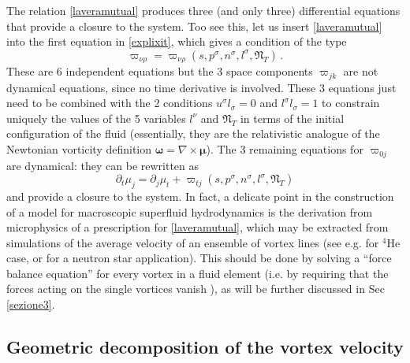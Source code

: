\documentclass[preprints,article,accept,moreauthors,pdftex]{mdpi}
\begin{document}
The relation \eqref{laveramutual} produces three (and only three) differential equations that provide a closure to the system. Too see this, let us insert \eqref{laveramutual} into the first equation in \eqref{explixit}, which gives a condition of the type
\begin{equation}
\varpi_{\nu \rho} = \varpi_{\nu \rho} (s,p^\sigma,n^\sigma,l^\sigma,\mathfrak{N}_{T}) \, .
\end{equation}  
These are 6 independent equations but the 3 space components $\varpi_{jk}$ are not dynamical equations, since no time derivative is involved. These 3 equations just need to be combined with the 2 conditions $u^\sigma l_\sigma=0$ and $l^\sigma l_\sigma=1$ to constrain uniquely the values of the 5 variables $l^\nu$ and $\mathfrak{N}_{T}$ in terms of the initial configuration of the fluid (essentially, they are the relativistic analogue of the Newtonian vorticity definition $\boldsymbol{\omega}=\nabla \times \boldsymbol{\mu}$).  
The 3 remaining equations for $\varpi_{0j}$ are dynamical: they can be rewritten as
\begin{equation}
\partial_t \mu_j = \partial_j \mu_t + \varpi_{tj} (s,p^\sigma,n^\sigma,l^\sigma,\mathfrak{N}_{T})
\end{equation}
and provide a closure to the system.
In fact, a delicate point in the construction of a model for macroscopic superfluid hydrodynamics is the derivation from microphysics of a prescription for \eqref{laveramutual}, which may be extracted from simulations of the average velocity of an ensemble of vortex lines (see e.g. \cite{Galantucci2020EPJP} for $^4$He case, or \cite{antonelli2020MNRAS} for a neutron star application). This should be done by solving a ``force balance equation'' for every vortex in a fluid element (i.e. by requiring that the forces acting on the single vortices vanish \cite{donnelly_book,andersson_sidery_2006,sonin_book_2016}), as will be further  discussed in Sec \ref{sezione3}.

\subsection{Geometric decomposition of the vortex velocity} 
\end{document}
